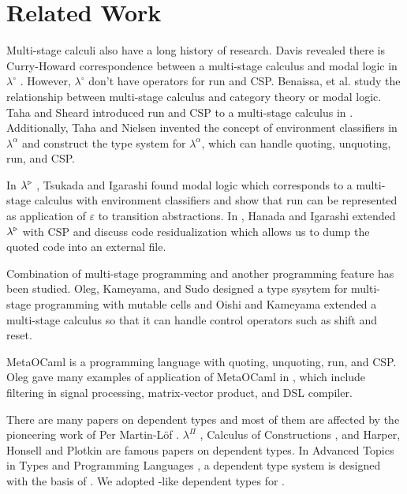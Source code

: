 
\section{Related Work}


Multi-stage calculi also have a long history of research.
Davis revealed there is Curry-Howard correspondence between a multi-stage calculus and modal logic in $\lambda^\circ$ \cite{davies1996temporal}.
However, $\lambda^\circ$ don't have operators for run and CSP.
Benaissa, et al. \cite{benaissa1999logical} study the relationship between multi-stage calculus and category theory or modal logic.
Taha and Sheard introduced run and CSP to a multi-stage calculus in \cite{MetaML}.
Additionally, Taha and Nielsen invented the concept of environment classifiers in $\lambda^\alpha$ \cite{taha2003environment} and 
construct the type system for $\lambda^\alpha$, which can handle quoting, unquoting, run, and CSP.

In $\lambda^{\mathop{\triangleright}}$ \cite{Tsukada}, Tsukada and Igarashi found modal logic which corresponds to a multi-stage calculus with environment classifiers and
show that run can be represented as application of $\varepsilon$ to transition abstractions.
In \LTP \cite{Hanada2014}, Hanada and Igarashi extended $\lambda^{\mathop{\triangleright}}$ with CSP and discuss code residualization 
which allows us to dump the quoted code into an external file.


Combination of multi-stage programming and another programming feature has been studied.
Oleg, Kameyama, and Sudo\cite{kiselyov2016refined} designed a type sysytem for multi-stage programming with mutable cells and
Oishi and Kameyama\cite{oishi2017staging} extended a multi-stage calculus so that it can handle control operators such as shift and reset.


MetaOCaml is a programming language with quoting, unquoting, run, and CSP.
Oleg gave many examples of application of MetaOCaml in \cite{8384206}, 
which include filtering in signal processing, matrix-vector product, and DSL compiler.


There are many papers on dependent types and most of them are affected by the pioneering work of Per Martin-L\"{o}f \cite{martin1973intuitionstic}.
$\lambda^\Pi$ \cite{Meyer1986}, Calculus of Constructions \cite{coquand:inria-00076024}, 
and Harper, Honsell and Plotkin \cite{harper1993framework} are famous papers on dependent types.
In Advanced Topics in Types and Programming Languages \cite{attapl},
a dependent type system \LLF is designed with the basis of \cite{harper1993framework}.
We adopted \cite{attapl}-like dependent types for \LMD.

